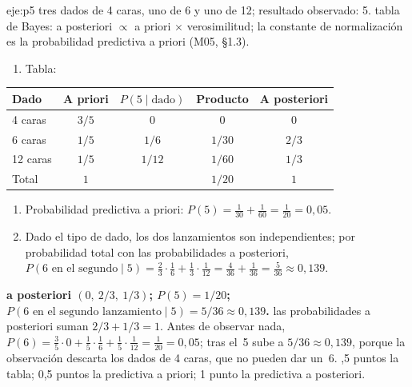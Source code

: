 \begin{solucion}{eje:p5}
\datos tres dados de 4 caras, uno de 6 y uno de 12; resultado observado: 5.
\planteamiento tabla de Bayes: a posteriori $\propto$ a priori $\times$ verosimilitud; la constante de normalización es la probabilidad predictiva a priori (M05, §1.3).
\pasos
\begin{enumerate}[label=\arabic*.]
  \item Tabla:
\end{enumerate}
\begin{center}
\small
\begin{tabular}{@{}lcccc@{}}
\toprule
Dado & A priori & $P(5\mid\text{dado})$ & Producto & A posteriori \\
\midrule
4 caras & $3/5$ & $0$ & $0$ & $0$ \\
6 caras & $1/5$ & $1/6$ & $1/30$ & $2/3$ \\
12 caras & $1/5$ & $1/12$ & $1/60$ & $1/3$ \\
\midrule
Total & $1$ & & $1/20$ & $1$ \\
\bottomrule
\end{tabular}
\end{center}
\begin{enumerate}[label=\arabic*.,start=2]
  \item Probabilidad predictiva a priori: $P(5)=\tfrac1{30}+\tfrac1{60}=\tfrac1{20}=0{,}05$.
  \item Dado el tipo de dado, los dos lanzamientos son independientes; por probabilidad total con las probabilidades a posteriori, $P(6\text{ en el segundo}\mid5)=\tfrac23\cdot\tfrac16+\tfrac13\cdot\tfrac1{12}=\tfrac4{36}+\tfrac1{36}=\tfrac5{36}\approx0{,}139$.
\end{enumerate}
\resultado \textbf{a posteriori $(0,\ 2/3,\ 1/3)$; $P(5)=1/20$; $P(6\text{ en el segundo lanzamiento}\mid5)=5/36\approx0{,}139$.}
\comprobacion las probabilidades a posteriori suman $2/3+1/3=1$. Antes de observar nada, $P(6)=\tfrac35\cdot0+\tfrac15\cdot\tfrac16+\tfrac15\cdot\tfrac1{12}=\tfrac1{20}=0{,}05$; tras el~5 sube a $5/36\approx0{,}139$, porque la observación descarta los dados de 4 caras, que no pueden dar un~6.
,5 puntos la tabla; 0,5 puntos la predictiva a priori; 1 punto la predictiva a posteriori.


\end{solucion}

